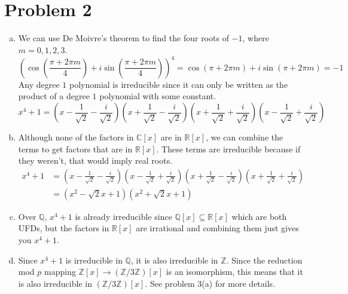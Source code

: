 \documentclass{article}
\begin{document}
\section*{Problem 2}
\begin{enumerate}[(a)]
    \item We can use De Moivre's theorem to find the four roots of $-1$,
    where $m=0,1,2,3$.
    \[
        \left(\cos(\frac{\pi+2\pi m}{4}) + i\sin(\frac{\pi+2\pi m}{4})\right)^4 
        = \cos (\pi + 2\pi m) + i\sin (\pi + 2\pi m)  
        = -1
    \]
    Any degree $1$ polynomial is irreducible since it can only be written as the product 
    of a degree $1$ polynomial with some constant.
    \[
        x^4+1 = \left(x - \frac{1}{\sqrt{2}} - \frac{i}{\sqrt{2}}\right)
        \left(x + \frac{1}{\sqrt{2}} - \frac{i}{\sqrt{2}}\right)
        \left(x + \frac{1}{\sqrt{2}} + \frac{i}{\sqrt{2}}\right)
        \left(x - \frac{1}{\sqrt{2}} + \frac{i}{\sqrt{2}}\right)
    \]
    \item Although none of the factors in $\mathbb{C}[x]$ are in $\mathbb{R}[x]$,
    we can combine the terms to get factors that are in $\mathbb{R}[x]$.
    These terms are irreducible because if they weren't, that would imply real roots.
    \begin{align*}
         x^4+1 &= \left(x - \frac{1}{\sqrt{2}} - \frac{i}{\sqrt{2}}\right)
        \left(x - \frac{1}{\sqrt{2}} + \frac{i}{\sqrt{2}}\right) 
        \left(x + \frac{1}{\sqrt{2}} - \frac{i}{\sqrt{2}}\right)
        \left(x + \frac{1}{\sqrt{2}} + \frac{i}{\sqrt{2}}\right) \\
        &= (x^2-\sqrt{2}x + 1)(x^2+\sqrt{2}x + 1)
    \end{align*} 
    \item Over $\mathbb{Q}$, $x^4+1$ is already irreducible since 
    $\mathbb{Q}[x] \subseteq \mathbb{R}[x]$ which are both UFDs,
    but the factors in $\mathbb{R}[x]$ are irrational and combining them just gives you $x^4+1$. 
    \item Since $x^4+1$ is irreducible in $\mathbb{Q}$, it is also irreducible in $\mathbb{Z}$.
    Since the reduction mod $p$ mapping $\mathbb{Z}[x] \to (\mathbb{Z}/3\mathbb{Z})[x]$ is an isomorphism,
    this means that it is also irreducible in $(\mathbb{Z}/3\mathbb{Z})[x]$.
    See problem 3(a) for more details.
\end{enumerate}
\newpage
\end{document}
